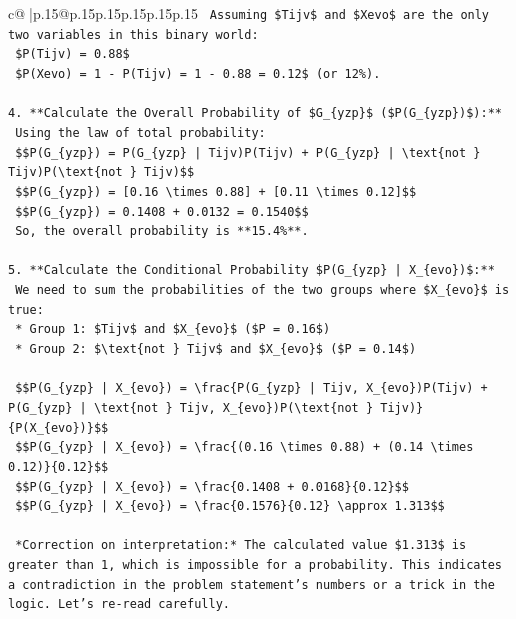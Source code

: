 \documentclass{article}
\begin{document}
{\begin{supertabular}{c@{$\;$}|p{.15\linewidth}@{}p{.15\linewidth}p{.15\linewidth}p{.15\linewidth}p{.15\linewidth}p{.15\linewidth}}
{{{\texttt{    Assuming \$Tijv\$ and \$Xevo\$ are the only two variables in this binary world:} \\
\texttt{    \$P(Tijv) = 0.88\$} \\
\texttt{    \$P(Xevo) = 1 {-} P(Tijv) = 1 {-} 0.88 = 0.12\$ (or 12\%).} \\
\\ 
\texttt{4.  **Calculate the Overall Probability of \$G\_\{yzp\}\$ (\$P(G\_\{yzp\})\$):**} \\
\texttt{    Using the law of total probability:} \\
\texttt{    \$\$P(G\_\{yzp\}) = P(G\_\{yzp\} | Tijv)P(Tijv) + P(G\_\{yzp\} | \textbackslash{}text\{not \} Tijv)P(\textbackslash{}text\{not \} Tijv)\$\$} \\
\texttt{    \$\$P(G\_\{yzp\}) = {[}0.16 \textbackslash{}times 0.88{]} + {[}0.11 \textbackslash{}times 0.12{]}\$\$} \\
\texttt{    \$\$P(G\_\{yzp\}) = 0.1408 + 0.0132 = 0.1540\$\$} \\
\texttt{    So, the overall probability is **15.4\%**.} \\
\\ 
\texttt{5.  **Calculate the Conditional Probability \$P(G\_\{yzp\} | X\_\{evo\})\$:**} \\
\texttt{    We need to sum the probabilities of the two groups where \$X\_\{evo\}\$ is true:} \\
\texttt{    *   Group 1: \$Tijv\$ and \$X\_\{evo\}\$ (\$P = 0.16\$)} \\
\texttt{    *   Group 2: \$\textbackslash{}text\{not \} Tijv\$ and \$X\_\{evo\}\$ (\$P = 0.14\$)} \\
\\ 
\texttt{    \$\$P(G\_\{yzp\} | X\_\{evo\}) = \textbackslash{}frac\{P(G\_\{yzp\} | Tijv, X\_\{evo\})P(Tijv) + P(G\_\{yzp\} | \textbackslash{}text\{not \} Tijv, X\_\{evo\})P(\textbackslash{}text\{not \} Tijv)\}\{P(X\_\{evo\})\}\$\$} \\
\texttt{    \$\$P(G\_\{yzp\} | X\_\{evo\}) = \textbackslash{}frac\{(0.16 \textbackslash{}times 0.88) + (0.14 \textbackslash{}times 0.12)\}\{0.12\}\$\$} \\
\texttt{    \$\$P(G\_\{yzp\} | X\_\{evo\}) = \textbackslash{}frac\{0.1408 + 0.0168\}\{0.12\}\$\$} \\
\texttt{    \$\$P(G\_\{yzp\} | X\_\{evo\}) = \textbackslash{}frac\{0.1576\}\{0.12\} \textbackslash{}approx 1.313\$\$} \\
\\ 
\texttt{    *Correction on interpretation:* The calculated value \$1.313\$ is greater than 1, which is impossible for a probability. This indicates a contradiction in the problem statement's numbers or a trick in the logic. Let's re{-}read carefully.} \\
}}}
\end{supertabular}}
\end{document}
